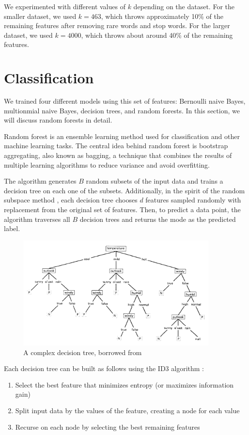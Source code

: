 \documentclass{article} %
\begin{document}
We experimented with different values of $k$ depending on the dataset. For the smaller dataset, we used $k = 463$, which throws approximately 10\% of the remaining features after removing rare words and stop words. For the larger dataset, we used $k = 4000$, which throws about around 40\% of the remaining features.

\section{Classification}

We trained four different models using this set of features: Bernoulli naive Bayes, multionmial naive Bayes, decision trees, and random forests. In this section, we will discuss random forests in detail.

Random forest \cite{randomforest} is an ensemble learning method used for classification and other machine learning tasks. The central idea behind random forest is bootstrap aggregating, also known as bagging, a technique that combines the results of multiple learning algorithms to reduce variance and avoid overfitting.

The algorithm generates $B$ random subsets of the input data and trains a decision tree on each one of the subsets. Additionally, in the spirit of the random subspace method \cite{randomsubspace}, each decision tree chooses $d$ features sampled randomly with replacement from the original set of features. Then, to predict a data point, the algorithm traverses all $B$ decision trees and returns the mode as the predicted label.

\begin{figure}[H]
  \centering
  \includegraphics[width=0.9\textwidth]{dt.png}
  \caption{A complex decision tree, borrowed from \cite{id3}}
\end{figure}

Each decision tree can be built as follows using the ID3 algorithm \cite{id3}:
\begin{enumerate}
\item Select the best feature that minimizes entropy (or maximizes information gain)
\item Split input data by the values of the feature, creating a node for each value
\item Recurse on each node by selecting the best remaining features
\end{enumerate}
\end{document}
